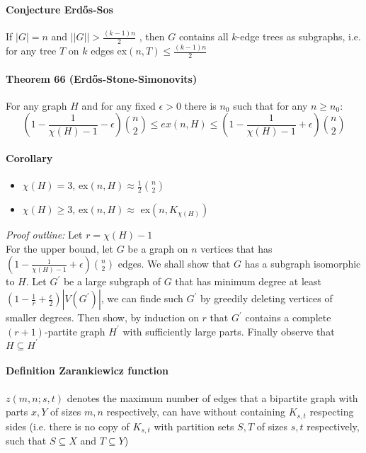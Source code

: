 \paragraph{Conjecture Erd\H{o}s-Sos} If $ |G| = n$ and $||G|| > \frac{(k-1)n}{2}$
, then $ G $ contains all $k$-edge trees as subgraphs, i.e. for any tree 
$ T $ on $ k $ edges ex$(n,T) \leq \frac{(k-1)n}{2}$

\paragraph{Theorem 66 (Erd\H{o}s-Stone-Simonovits)} For any graph $ H $ and for any 
fixed $ \epsilon > 0 $ there is $ n_0 $ such that for any $ n \geq n_0 $:
$$ (1 - \frac{1}{\chi(H)-1} - \epsilon)\binom{n}{2} \leq ex(n,H) \leq
(1 - \frac{1}{\chi(H)-1}+\epsilon) \binom{n}{2} $$

\paragraph{Corollary}
\begin{itemize}
    \item $\chi(H) = 3$, ex$(n,H) \approx \frac{1}{2}\binom{n}{2}$
    \item $\chi(H) \geq 3$, ex$(n,H) \approx$ ex$(n,K_{\chi(H)})$
\end{itemize}

\noindent
{}

\smallskip \noindent
\textit{Proof outline:} Let $ r = \chi(H) - 1 $ \\
For the upper bound, let $ G $ be a graph on $ n $ vertices that has 
$ (1 - \frac{1}{\chi(H) - 1} + \epsilon) \binom{n}{2} $ edges. We shall show 
that $ G $ has a subgraph isomorphic to $ H $. Let $ G^\prime $ be a large 
subgraph of $ G $ that has minimum degree at least 
$ (1 - \frac{1}{r} + \frac{\epsilon}{2}) |V(G^\prime)|$, we can finde such 
$ G^\prime $ by greedily deleting vertices of smaller degrees. Then show, 
by induction on $ r $ that $ G^\prime $ contains a complete $(r+1)$-partite 
graph $ H^\prime $ with sufficiently large parts. Finally observe that 
$ H \subseteq H^\prime $

\paragraph{Definition Zarankiewicz function} $ z(m,n;s,t) $ denotes the maximum
number of edges that a bipartite graph with parts $ x,Y$ of sizes $ m,n$
respectively, can have without containing $ K_{s,t} $ respecting sides
(i.e. there is no copy of $ K_{s,t} $ with partition sets $ S,T $ of sizes
$s,t $ respectively, such that $ S \subseteq X $ and $ T \subseteq Y $)

